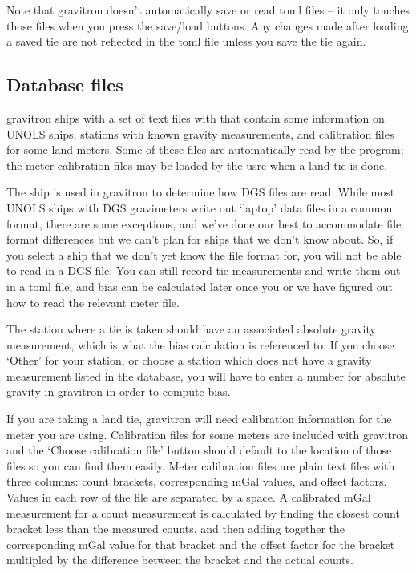 \documentclass{pfpe-manual}
\begin{document}
Note that gravitron doesn't automatically save or read toml files -- it only touches those files when you press the save/load buttons. Any changes made after loading a saved tie are not reflected in the toml file unless you save the tie again.

\subsection{Database files}
\label{datab}
gravitron ships with a set of text files with that contain some information on UNOLS ships, stations with known gravity measurements, and calibration files for some land meters. Some of these files are automatically read by the program; the meter calibration files may be loaded by the usre when a land tie is done.

The ship is used in gravitron to determine how DGS files are read. While most UNOLS ships with DGS gravimeters write out `laptop' data files in a common format, there are some exceptions, and we've done our best to accommodate file format differences but we can't plan for ships that we don't know about. So, if you select a ship that we don't yet know the file format for, you will not be able to read in a DGS file. You can still record tie measurements and write them out in a toml file, and bias can be calculated later once you or we have figured out how to read the relevant meter file.

The station where a tie is taken should have an associated absolute gravity measurement, which is what the bias calculation is referenced to. If you choose `Other' for your station, or choose a station which does not have a gravity measurement listed in the database, you will have to enter a number for absolute gravity in gravitron in order to compute bias.

If you are taking a land tie, gravitron will need calibration information for the meter you are using. Calibration files for some meters are included with gravitron and the `Choose calibration file' button should default to the location of those files so you can find them easily. Meter calibration files are plain text files with three columns: count brackets, corresponding mGal values, and offset factors. Values in each row of the file are separated by a space. A calibrated mGal measurement for a count measurement is calculated by finding the closest count bracket less than the measured counts, and then adding together the corresponding mGal value for that bracket and the offset factor for the bracket multipled by the difference between the bracket and the actual counts.
\end{document}
